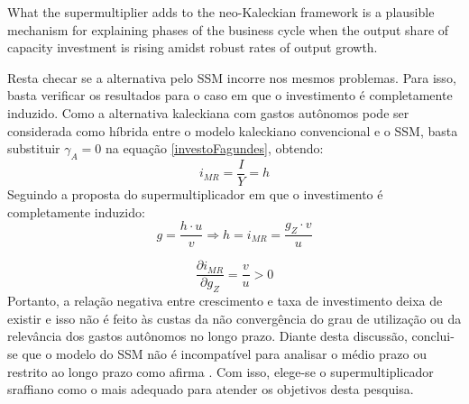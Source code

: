 \begin{citacao}
	What the supermultiplier adds to the neo-Kaleckian framework is a plausible mechanism for explaining phases
	of the business cycle when the output share of capacity investment is rising amidst robust rates of output growth. \cite[p.~9]{fiebiger_trend_2017}
\end{citacao}

Resta checar se a alternativa pelo SSM incorre nos mesmos problemas. Para isso, basta verificar os resultados para o caso em que o investimento é completamente induzido. Como a alternativa kaleckiana com gastos autônomos pode ser considerada como híbrida entre o modelo kaleckiano convencional e o SSM, basta substituir $\gamma_A = 0$ na equação \ref{investoFagundes}, obtendo:
$$
i_{MR} = \frac{I}{Y} =  h
$$
Seguindo a proposta do supermultiplicador em que o investimento é completamente induzido:
$$
g = \frac{h\cdot u}{v} \Rightarrow h = i_{MR} = \frac{g_Z\cdot v}{u}
$$

$$
\frac{\partial i_{MR}}{\partial g_Z} = \frac{v}{u} > 0
$$
Portanto, a relação negativa entre crescimento e taxa de investimento deixa de existir e isso não é feito às custas da não convergência do grau de utilização ou da relevância dos gastos autônomos no longo prazo. 
Diante desta discussão, conclui-se que o modelo do SSM não é incompatível para analisar o médio prazo ou restrito ao longo prazo como afirma \textcite{nikiforos_comments_2018}. Com isso, elege-se o supermultiplicador sraffiano como o mais adequado para atender os objetivos desta pesquisa. 





